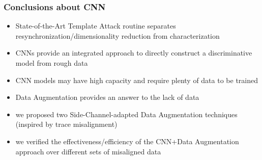 \begin{frame}
\frametitle{Conclusions about CNN}

\begin{block}{}
\begin{itemize}
\item State-of-the-Art Template Attack routine separates resynchronization/dimensionality reduction from characterization \pause
\item CNNs provide an integrated approach to directly construct a discriminative model from rough data \pause
\item CNN models may have high capacity and require plenty of data to be trained \pause 
\item Data Augmentation provides an answer to the lack of data \pause
\item we proposed two Side-Channel-adapted Data Augmentation techniques (inspired by trace misalignment)\pause
\item we verified the effectiveness/efficiency of the CNN+Data Augmentation approach over different sets of misaligned data
\end{itemize}
\end{block}

\end{frame}
